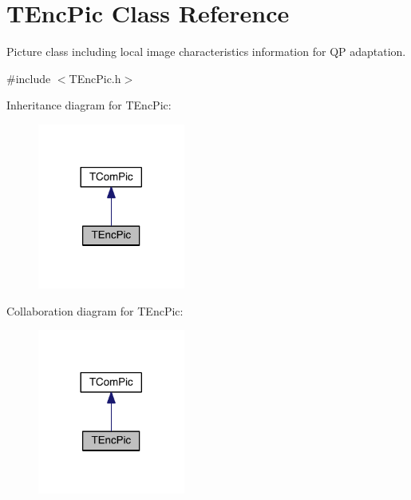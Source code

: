 \hypertarget{class_t_enc_pic}{}\section{T\+Enc\+Pic Class Reference}
\label{class_t_enc_pic}


Picture class including local image characteristics information for QP adaptation.  




{\ttfamily \#include $<$T\+Enc\+Pic.\+h$>$}



Inheritance diagram for T\+Enc\+Pic\+:
\nopagebreak
\begin{figure}[H]
\begin{center}
\leavevmode
\includegraphics[width=137pt]{d9/d7d/class_t_enc_pic__inherit__graph}
\end{center}
\end{figure}


Collaboration diagram for T\+Enc\+Pic\+:
\nopagebreak
\begin{figure}[H]
\begin{center}
\leavevmode
\includegraphics[width=137pt]{d6/d44/class_t_enc_pic__coll__graph}
\end{center}
\end{figure}
